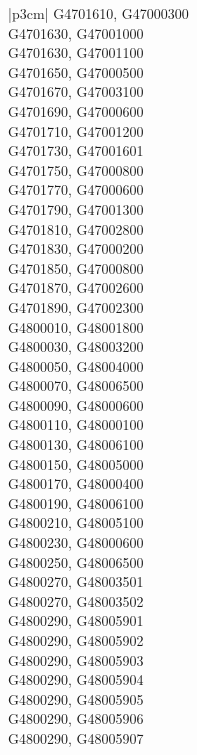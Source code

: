 \begin{customLongTable}{ |p{3cm}| }
G4701610, G47000300 \\ \hline
G4701630, G47001000 \\ \hline
G4701630, G47001100 \\ \hline
G4701650, G47000500 \\ \hline
G4701670, G47003100 \\ \hline
G4701690, G47000600 \\ \hline
G4701710, G47001200 \\ \hline
G4701730, G47001601 \\ \hline
G4701750, G47000800 \\ \hline
G4701770, G47000600 \\ \hline
G4701790, G47001300 \\ \hline
G4701810, G47002800 \\ \hline
G4701830, G47000200 \\ \hline
G4701850, G47000800 \\ \hline
G4701870, G47002600 \\ \hline
G4701890, G47002300 \\ \hline
G4800010, G48001800 \\ \hline
G4800030, G48003200 \\ \hline
G4800050, G48004000 \\ \hline
G4800070, G48006500 \\ \hline
G4800090, G48000600 \\ \hline
G4800110, G48000100 \\ \hline
G4800130, G48006100 \\ \hline
G4800150, G48005000 \\ \hline
G4800170, G48000400 \\ \hline
G4800190, G48006100 \\ \hline
G4800210, G48005100 \\ \hline
G4800230, G48000600 \\ \hline
G4800250, G48006500 \\ \hline
G4800270, G48003501 \\ \hline
G4800270, G48003502 \\ \hline
G4800290, G48005901 \\ \hline
G4800290, G48005902 \\ \hline
G4800290, G48005903 \\ \hline
G4800290, G48005904 \\ \hline
G4800290, G48005905 \\ \hline
G4800290, G48005906 \\ \hline
G4800290, G48005907 \\ \hline

\end{customLongTable}
